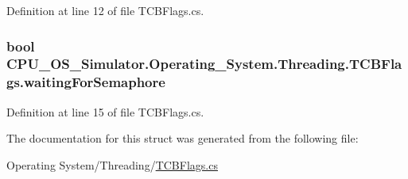 Definition at line 12 of file T\+C\+B\+Flags.\+cs.

\hypertarget{struct_c_p_u___o_s___simulator_1_1_operating___system_1_1_threading_1_1_t_c_b_flags_aaa09adaa90f9dece8ddebd92f64fc2ad}{}
\subsubsection[{waiting\+For\+Semaphore}]{\setlength{\rightskip}{0pt plus 5cm}bool C\+P\+U\+\_\+\+O\+S\+\_\+\+Simulator.\+Operating\+\_\+\+System.\+Threading.\+T\+C\+B\+Flags.\+waiting\+For\+Semaphore}\label{struct_c_p_u___o_s___simulator_1_1_operating___system_1_1_threading_1_1_t_c_b_flags_aaa09adaa90f9dece8ddebd92f64fc2ad}


Definition at line 15 of file T\+C\+B\+Flags.\+cs.



The documentation for this struct was generated from the following file\+:\begin{DoxyCompactItemize}
\item 
Operating System/\+Threading/\hyperlink{_t_c_b_flags_8cs}{T\+C\+B\+Flags.\+cs}\end{DoxyCompactItemize}
